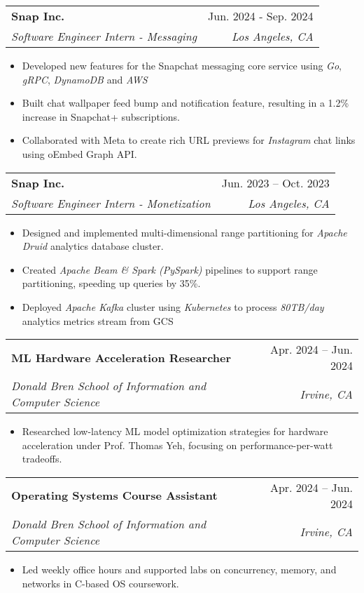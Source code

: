\documentclass[letterpaper,11pt]{article}
\makeatletter
\newcommand{\resumeItem}[1]{
  \item\small{
    {#1 \vspace{-2pt}}
  }
}
\newcommand{\resumeSubheading}[4]{
  \vspace{-2pt}\item
    \begin{tabular*}{0.97\textwidth}[t]{l@{\extracolsep{\fill}}r}
      \textbf{#1} & #2 \\
      \textit{#3} & \textit{#4} \\
    \end{tabular*}\vspace{-7pt}
}
\newcommand{\resumeItemListStart}{\begin{itemize}}
\newcommand{\resumeItemListEnd}{\end{itemize}\vspace{-5pt}}
\makeatother
\begin{document}
    \resumeSubheading
      {Snap Inc.}{Jun. 2024 - Sep. 2024}
      {Software Engineer Intern - Messaging}{Los Angeles, CA}
      \resumeItemListStart
        \resumeItem{Developed new features for the Snapchat messaging core service using \textit{Go}, \textit{gRPC}, \textit{DynamoDB} and \textit{AWS}}
        \resumeItem{Built chat wallpaper feed bump and notification feature, resulting in a 1.2\% increase in Snapchat+ subscriptions.
        }
        \resumeItem{Collaborated with Meta to create rich URL previews for \textit{Instagram} chat links using oEmbed Graph API.}
      \resumeItemListEnd

    \resumeSubheading
      {Snap Inc.}{Jun. 2023 -- Oct. 2023}
      {Software Engineer Intern - Monetization}{Los Angeles, CA}
      \resumeItemListStart
        \resumeItem{Designed and implemented multi-dimensional range partitioning for \textit{Apache Druid} analytics database cluster.}
        \resumeItem{Created \textit{Apache Beam \& Spark (PySpark)} pipelines to support range partitioning, speeding up queries by 35\%.}
        \resumeItem{Deployed \textit{Apache Kafka} cluster using \textit{Kubernetes} to process \textit{80TB/day} analytics metrics stream from GCS}


        
        
      \resumeItemListEnd

      \resumeSubheading
      {ML Hardware Acceleration Researcher}{Apr. 2024 -- Jun. 2024}
      {Donald Bren School of Information and Computer Science}{Irvine, CA}
      \resumeItemListStart
        \resumeItem{Researched low-latency ML model optimization strategies for hardware acceleration under Prof. Thomas Yeh, focusing on performance-per-watt tradeoffs.}
      \resumeItemListEnd
    
    \resumeSubheading
      {Operating Systems Course Assistant}{Apr. 2024 -- Jun. 2024}
      {Donald Bren School of Information and Computer Science}{Irvine, CA}
      \resumeItemListStart
        \resumeItem{Led weekly office hours and supported labs on concurrency, memory, and networks in C-based OS coursework.}
      \resumeItemListEnd
    
\end{document}
